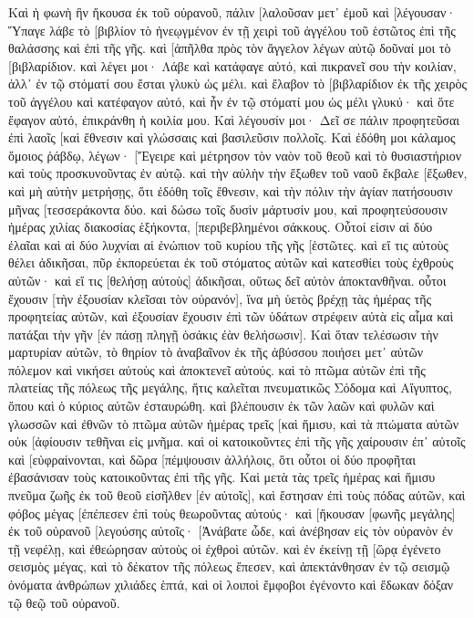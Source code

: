 Καὶ ἡ φωνὴ ἣν ἤκουσα ἐκ τοῦ οὐρανοῦ, πάλιν [λαλοῦσαν μετ᾽ ἐμοῦ καὶ [λέγουσαν· Ὕπαγε λάβε τὸ [βιβλίον τὸ ἠνεῳγμένον ἐν τῇ χειρὶ τοῦ ἀγγέλου τοῦ ἑστῶτος ἐπὶ τῆς θαλάσσης καὶ ἐπὶ τῆς γῆς. 
καὶ [ἀπῆλθα πρὸς τὸν ἄγγελον λέγων αὐτῷ δοῦναί μοι τὸ [βιβλαρίδιον. καὶ λέγει μοι· Λάβε καὶ κατάφαγε αὐτό, καὶ πικρανεῖ σου τὴν κοιλίαν, ἀλλ᾽ ἐν τῷ στόματί σου ἔσται γλυκὺ ὡς μέλι. 
καὶ ἔλαβον τὸ [βιβλαρίδιον ἐκ τῆς χειρὸς τοῦ ἀγγέλου καὶ κατέφαγον αὐτό, καὶ ἦν ἐν τῷ στόματί μου ὡς μέλι γλυκύ· καὶ ὅτε ἔφαγον αὐτό, ἐπικράνθη ἡ κοιλία μου. 
Καὶ λέγουσίν μοι· Δεῖ σε πάλιν προφητεῦσαι ἐπὶ λαοῖς [καὶ ἔθνεσιν καὶ γλώσσαις καὶ βασιλεῦσιν πολλοῖς. 
Καὶ ἐδόθη μοι κάλαμος ὅμοιος ῥάβδῳ, λέγων· [Ἔγειρε καὶ μέτρησον τὸν ναὸν τοῦ θεοῦ καὶ τὸ θυσιαστήριον καὶ τοὺς προσκυνοῦντας ἐν αὐτῷ. 
καὶ τὴν αὐλὴν τὴν ἔξωθεν τοῦ ναοῦ ἔκβαλε [ἔξωθεν, καὶ μὴ αὐτὴν μετρήσῃς, ὅτι ἐδόθη τοῖς ἔθνεσιν, καὶ τὴν πόλιν τὴν ἁγίαν πατήσουσιν μῆνας [τεσσεράκοντα δύο. 
καὶ δώσω τοῖς δυσὶν μάρτυσίν μου, καὶ προφητεύσουσιν ἡμέρας χιλίας διακοσίας ἑξήκοντα, [περιβεβλημένοι σάκκους. 
Οὗτοί εἰσιν αἱ δύο ἐλαῖαι καὶ αἱ δύο λυχνίαι αἱ ἐνώπιον τοῦ κυρίου τῆς γῆς [ἑστῶτες. 
καὶ εἴ τις αὐτοὺς θέλει ἀδικῆσαι, πῦρ ἐκπορεύεται ἐκ τοῦ στόματος αὐτῶν καὶ κατεσθίει τοὺς ἐχθροὺς αὐτῶν· καὶ εἴ τις [θελήσῃ αὐτοὺς] ἀδικῆσαι, οὕτως δεῖ αὐτὸν ἀποκτανθῆναι. 
οὗτοι ἔχουσιν [τὴν ἐξουσίαν κλεῖσαι τὸν οὐρανόν], ἵνα μὴ ὑετὸς βρέχῃ τὰς ἡμέρας τῆς προφητείας αὐτῶν, καὶ ἐξουσίαν ἔχουσιν ἐπὶ τῶν ὑδάτων στρέφειν αὐτὰ εἰς αἷμα καὶ πατάξαι τὴν γῆν [ἐν πάσῃ πληγῇ ὁσάκις ἐὰν θελήσωσιν]. 
Καὶ ὅταν τελέσωσιν τὴν μαρτυρίαν αὐτῶν, τὸ θηρίον τὸ ἀναβαῖνον ἐκ τῆς ἀβύσσου ποιήσει μετ᾽ αὐτῶν πόλεμον καὶ νικήσει αὐτοὺς καὶ ἀποκτενεῖ αὐτούς. 
καὶ τὸ πτῶμα αὐτῶν ἐπὶ τῆς πλατείας τῆς πόλεως τῆς μεγάλης, ἥτις καλεῖται πνευματικῶς Σόδομα καὶ Αἴγυπτος, ὅπου καὶ ὁ κύριος αὐτῶν ἐσταυρώθη. 
καὶ βλέπουσιν ἐκ τῶν λαῶν καὶ φυλῶν καὶ γλωσσῶν καὶ ἐθνῶν τὸ πτῶμα αὐτῶν ἡμέρας τρεῖς [καὶ ἥμισυ, καὶ τὰ πτώματα αὐτῶν οὐκ [ἀφίουσιν τεθῆναι εἰς μνῆμα. 
καὶ οἱ κατοικοῦντες ἐπὶ τῆς γῆς χαίρουσιν ἐπ᾽ αὐτοῖς καὶ [εὐφραίνονται, καὶ δῶρα [πέμψουσιν ἀλλήλοις, ὅτι οὗτοι οἱ δύο προφῆται ἐβασάνισαν τοὺς κατοικοῦντας ἐπὶ τῆς γῆς. 
Καὶ μετὰ τὰς τρεῖς ἡμέρας καὶ ἥμισυ πνεῦμα ζωῆς ἐκ τοῦ θεοῦ εἰσῆλθεν [ἐν αὐτοῖς], καὶ ἔστησαν ἐπὶ τοὺς πόδας αὐτῶν, καὶ φόβος μέγας [ἐπέπεσεν ἐπὶ τοὺς θεωροῦντας αὐτούς· 
καὶ [ἤκουσαν [φωνῆς μεγάλης] ἐκ τοῦ οὐρανοῦ [λεγούσης αὐτοῖς· [Ἀνάβατε ὧδε, καὶ ἀνέβησαν εἰς τὸν οὐρανὸν ἐν τῇ νεφέλῃ, καὶ ἐθεώρησαν αὐτοὺς οἱ ἐχθροὶ αὐτῶν. 
καὶ ἐν ἐκείνῃ τῇ [ὥρᾳ ἐγένετο σεισμὸς μέγας, καὶ τὸ δέκατον τῆς πόλεως ἔπεσεν, καὶ ἀπεκτάνθησαν ἐν τῷ σεισμῷ ὀνόματα ἀνθρώπων χιλιάδες ἑπτά, καὶ οἱ λοιποὶ ἔμφοβοι ἐγένοντο καὶ ἔδωκαν δόξαν τῷ θεῷ τοῦ οὐρανοῦ. 
